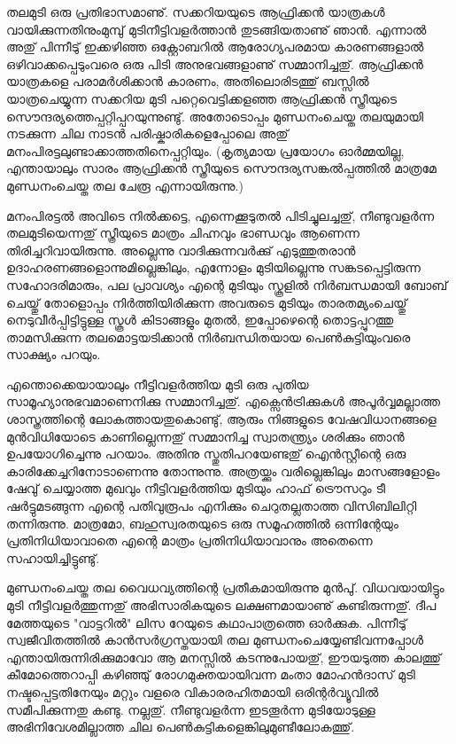 ﻿
\vskip 2pt

തലമുടി ഒരു പ്രതിഭാസമാണു്. സക്കറിയയുടെ ആഫ്രിക്കന്‍ യാത്രകള്‍ വായിക്കുന്നതിനുംമുമ്പു് മുടിനീട്ടിവളര്‍ത്താന്‍ 
തുടങ്ങിയതാണു് ഞാന്‍. എന്നാല്‍ അതു് പിന്നീടു് ഇക്കഴിഞ്ഞ ഒക്റ്റോബറില്‍ ആരോഗ്യപരമായ കാരണങ്ങളാല്‍ 
ഒഴിവാക്കപ്പെടുംവരെ ഒരു പിടി അനുഭവങ്ങളാണു് സമ്മാനിച്ചതു്. ആഫ്രിക്കന്‍ യാത്രകളെ പരാമര്‍ശിക്കാന്‍ കാരണം, 
അതിലൊരിടത്തു് ബസ്സില്‍ യാത്രചെയ്യുന്ന സക്കറിയ മുടി പറ്റെവെട്ടിക്കളഞ്ഞ ആഫ്രിക്കന്‍ സ്ത്രീയുടെ 
സൌന്ദര്യത്തെപ്പറ്റിപ്പറയുന്നുണ്ടു്. അതോടൊപ്പം മുണ്ഡനംചെയ്ത തലയുമായി നടക്കുന്ന ചില നാടന്‍ 
പരിഷ്കാരികളെപ്പോലെ അതു് മനംപിരട്ടലുണ്ടാക്കാത്തതിനെപ്പറ്റിയും. (കൃത്യമായ പ്രയോഗം ഓര്‍മ്മയില്ല, എന്തായാലും 
സാരം ആഫ്രിക്കന്‍ സ്ത്രീയുടെ സൌന്ദര്യസങ്കല്‍പ്പത്തില്‍ മാത്രമേ മുണ്ഡനംചെയ്ത തല ചേരൂ എന്നായിരുന്നു.)

മനംപിരട്ടല്‍ അവിടെ നില്‍ക്കട്ടെ, എന്നെക്കൂടുതല്‍ പിടിച്ചുലച്ചതു്, നീണ്ടുവളര്‍ന്ന തലമുടിയെന്നതു് സ്ത്രീയുടെ മാത്രം ചിഹ്നവും 
ഭാണ്ഡവും ആണെന്ന തിരിച്ചറിവായിരുന്നു. അല്ലെന്നു വാദിക്കുന്നവര്‍ക്കു് എടുത്തുതരാന്‍ ഉദാഹരണങ്ങളൊന്നുമില്ലെങ്കിലും, 
എന്നോളം മുടിയില്ലെന്നു സങ്കടപ്പെട്ടിരുന്ന സഹോദരിമാരും, പല പ്രാവശ്യം എന്റെ മുടിയും സ്കൂളില്‍ നിര്‍ബന്ധമായി ബോബ് 
ചെയ്തു് തോളൊപ്പം നിര്‍ത്തിയിരിക്കുന്ന അവരുടെ മുടിയും താരതമ്യംചെയ്തു് നെടുവീര്‍പ്പിട്ടിട്ടുള്ള സ്കൂള്‍ കിടാങ്ങളും മുതല്‍, 
ഇപ്പോഴെന്റെ തൊട്ടപ്പുറത്തു താമസിക്കുന്ന തലമൊട്ടയടിക്കാന്‍ നിര്‍ബന്ധിതയായ പെണ്‍കുട്ടിയുംവരെ സാക്ഷ്യം പറയും.

എന്തൊക്കെയായാലും നീട്ടിവളര്‍ത്തിയ മുടി ഒരു പുതിയ സാമൂഹ്യാനുഭവമാണെനിക്കു സമ്മാനിച്ചതു്. എക്സെന്‍ട്രിക്കുകള്‍ 
അപൂര്‍വ്വമല്ലാത്ത ശാസ്ത്രത്തിന്റെ ലോകത്തായതുകൊണ്ടു്, ആരും നിങ്ങളുടെ വേഷവിധാനങ്ങളെ മുന്‍വിധിയോടെ 
കാണില്ലെന്നതു് സമ്മാനിച്ച സ്വാതന്ത്ര്യം ശരിക്കും ഞാന്‍ ഉപയോഗിച്ചെന്നു പറയാം. അതിനു സ്തുതിപറയേണ്ടതു് ഐന്‍സ്റ്റീന്റെ 
ഒരു കാരിക്കേച്ചറിനോടാണെന്നു തോന്നുന്നു. അത്രയ്ക്കും വരില്ലെങ്കിലും മാസങ്ങളോളം ഷേവു് ചെയ്യാത്ത മുഖവും നീട്ടിവളര്‍ത്തിയ 
മുടിയും ഹാഫ് ട്രൌസറും ടീ ഷര്‍ട്ടുമടങ്ങുന്ന എന്റെ പതിവുരൂപം എനിക്കും ചെറുതല്ലതാത്ത വിസിബിലിറ്റി തന്നിരുന്നു. 
മാത്രമോ, ബഹുസ്വരതയുടെ ഒരു സമൂഹത്തില്‍ ഒന്നിന്റേയും പ്രതിനിധിയാവാതെ എന്റെ മാത്രം പ്രതിനിധിയാവാനും 
അതെന്നെ സഹായിച്ചിട്ടുണ്ടു്.

മുണ്ഡനംചെയ്ത തല വൈധവ്യത്തിന്റെ പ്രതീകമായിരുന്നു മുന്‍പു്. വിധവയായിട്ടും മുടി നീട്ടിവളര്‍ത്തുന്നതു് അഭിസാരികയുടെ 
ലക്ഷണമായാണു് കണ്ടിരുന്നതു്. ദീപ മേത്തയുടെ "വാട്ടറില്‍" ലിസ റേയുടെ കഥാപാത്രത്തെ ഓര്‍ക്കുക. പിന്നീടു് 
സ്വജീവിതത്തില്‍ കാന്‍സര്‍ഗ്രസ്തയായി തല മുണ്ഡനംചെയ്യേണ്ടിവന്നപ്പോള്‍ എന്തായിരുന്നിരിക്കുമാവോ ആ മനസ്സില്‍ 
കടന്നുപോയതു്, ഈയടുത്ത കാലത്തു് കീമോത്തെറാപ്പി കഴിഞ്ഞു് രോഗമുക്തയായിവന്ന മംതാ മോഹന്‍ദാസ് മുടി 
നഷ്ടപ്പെട്ടതിനേയും മറ്റും വളരെ വികാരരഹിതമായി ഒരിന്റര്‍വ്യൂവില്‍ സമീപിക്കുന്നതു കണ്ടു. നല്ലതു്. നീണ്ടുവളര്‍ന്ന ഇടതൂര്‍ന്ന 
മുടിയോടുള്ള അഭിനിവേശമില്ലാത്ത ചില പെണ്‍കുട്ടികളെങ്കിലുമുണ്ടീലോകത്തു്.

